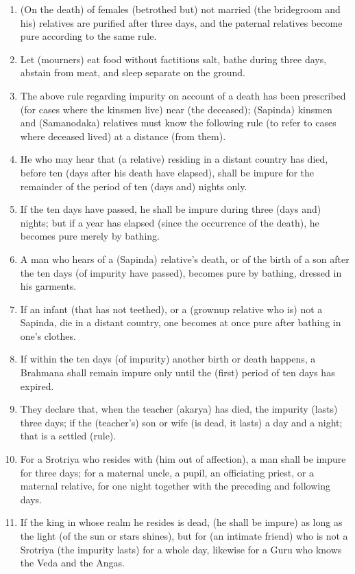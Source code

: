 \begin{enumerate}
\item (On the death) of females (betrothed but) not married (the bridegroom and his) relatives are purified after three days, and the paternal relatives become pure according to the same rule.
\item Let (mourners) eat food without factitious salt, bathe during three days, abstain from meat, and sleep separate on the ground.
\item The above rule regarding impurity on account of a death has been prescribed (for cases where the kinsmen live) near (the deceased); (Sapinda) kinsmen and (Samanodaka) relatives must know the following rule (to refer to cases where deceased lived) at a distance (from them).
\item He who may hear that (a relative) residing in a distant country has died, before ten (days after his death have elapsed), shall be impure for the remainder of the period of ten (days and) nights only.
\item If the ten days have passed, he shall be impure during three (days and) nights; but if a year has elapsed (since the occurrence of the death), he becomes pure merely by bathing.
\item A man who hears of a (Sapinda) relative's death, or of the birth of a son after the ten days (of impurity have passed), becomes pure by bathing, dressed in his garments.
\item If an infant (that has not teethed), or a (grownup relative who is) not a Sapinda, die in a distant country, one becomes at once pure after bathing in one's clothes.
\item If within the ten days (of impurity) another birth or death happens, a Brahmana shall remain impure only until the (first) period of ten days has expired.
\item They declare that, when the teacher (akarya) has died, the impurity (lasts) three days; if the (teacher's) son or wife (is dead, it lasts) a day and a night; that is a settled (rule).
\item For a Srotriya who resides with (him out of affection), a man shall be impure for three days; for a maternal uncle, a pupil, an officiating priest, or a maternal relative, for one night together with the preceding and following days.
\item If the king in whose realm he resides is dead, (he shall be impure) as long as the light (of the sun or stars shines), but for (an intimate friend) who is not a Srotriya (the impurity lasts) for a whole day, likewise for a Guru who knows the Veda and the Angas.

\end{enumerate}
